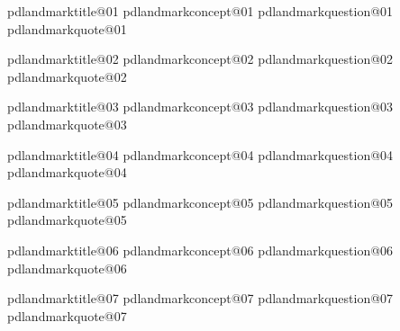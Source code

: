 \expandafter\def\csname pdlandmarktitle@1\endcsname{\csname pdlandmarktitle@01\endcsname}
\expandafter\def\csname pdlandmarkconcept@1\endcsname{\csname pdlandmarkconcept@01\endcsname}
\expandafter\def\csname pdlandmarkquestion@1\endcsname{\csname pdlandmarkquestion@01\endcsname}
\expandafter\def\csname pdlandmarkquote@1\endcsname{\csname pdlandmarkquote@01\endcsname}

\expandafter\def\csname pdlandmarktitle@2\endcsname{\csname pdlandmarktitle@02\endcsname}
\expandafter\def\csname pdlandmarkconcept@2\endcsname{\csname pdlandmarkconcept@02\endcsname}
\expandafter\def\csname pdlandmarkquestion@2\endcsname{\csname pdlandmarkquestion@02\endcsname}
\expandafter\def\csname pdlandmarkquote@2\endcsname{\csname pdlandmarkquote@02\endcsname}

\expandafter\def\csname pdlandmarktitle@3\endcsname{\csname pdlandmarktitle@03\endcsname}
\expandafter\def\csname pdlandmarkconcept@3\endcsname{\csname pdlandmarkconcept@03\endcsname}
\expandafter\def\csname pdlandmarkquestion@3\endcsname{\csname pdlandmarkquestion@03\endcsname}
\expandafter\def\csname pdlandmarkquote@3\endcsname{\csname pdlandmarkquote@03\endcsname}

\expandafter\def\csname pdlandmarktitle@4\endcsname{\csname pdlandmarktitle@04\endcsname}
\expandafter\def\csname pdlandmarkconcept@4\endcsname{\csname pdlandmarkconcept@04\endcsname}
\expandafter\def\csname pdlandmarkquestion@4\endcsname{\csname pdlandmarkquestion@04\endcsname}
\expandafter\def\csname pdlandmarkquote@4\endcsname{\csname pdlandmarkquote@04\endcsname}

\expandafter\def\csname pdlandmarktitle@5\endcsname{\csname pdlandmarktitle@05\endcsname}
\expandafter\def\csname pdlandmarkconcept@5\endcsname{\csname pdlandmarkconcept@05\endcsname}
\expandafter\def\csname pdlandmarkquestion@5\endcsname{\csname pdlandmarkquestion@05\endcsname}
\expandafter\def\csname pdlandmarkquote@5\endcsname{\csname pdlandmarkquote@05\endcsname}

\expandafter\def\csname pdlandmarktitle@6\endcsname{\csname pdlandmarktitle@06\endcsname}
\expandafter\def\csname pdlandmarkconcept@6\endcsname{\csname pdlandmarkconcept@06\endcsname}
\expandafter\def\csname pdlandmarkquestion@6\endcsname{\csname pdlandmarkquestion@06\endcsname}
\expandafter\def\csname pdlandmarkquote@6\endcsname{\csname pdlandmarkquote@06\endcsname}

\expandafter\def\csname pdlandmarktitle@7\endcsname{\csname pdlandmarktitle@07\endcsname}
\expandafter\def\csname pdlandmarkconcept@7\endcsname{\csname pdlandmarkconcept@07\endcsname}
\expandafter\def\csname pdlandmarkquestion@7\endcsname{\csname pdlandmarkquestion@07\endcsname}
\expandafter\def\csname pdlandmarkquote@7\endcsname{\csname pdlandmarkquote@07\endcsname}

